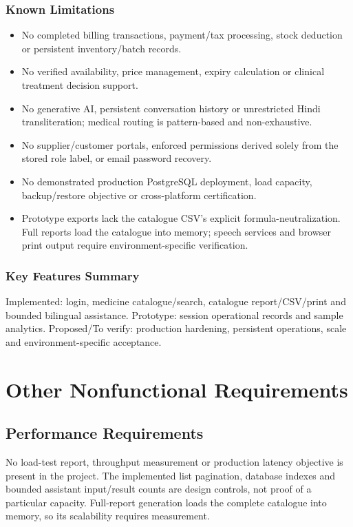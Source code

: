 \documentclass{article}
\newcommand{\SummaryBox}[1]{\par\noindent\colorbox{uiFill}{\parbox{\dimexpr\linewidth-2\fboxsep\relax}{\small\sffamily #1}}\par}
\begin{document}
\subsubsection{Known Limitations}
\begin{itemize}
\item No completed billing transactions, payment/tax processing, stock deduction or persistent inventory/batch records.
\item No verified availability, price management, expiry calculation or clinical treatment decision support.
\item No generative AI, persistent conversation history or unrestricted Hindi transliteration; medical routing is pattern-based and non-exhaustive.
\item No supplier/customer portals, enforced permissions derived solely from the stored role label, or email password recovery.
\item No demonstrated production PostgreSQL deployment, load capacity, backup/restore objective or cross-platform certification.
\item Prototype exports lack the catalogue CSV's explicit formula-neutralization. Full reports load the catalogue into memory; speech services and browser print output require environment-specific verification.
\end{itemize}

\subsubsection{Key Features Summary}
\SummaryBox{Implemented: login, medicine catalogue/search, catalogue report/CSV/print and bounded bilingual assistance. Prototype: session operational records and sample analytics. Proposed/To verify: production hardening, persistent operations, scale and environment-specific acceptance.}

\clearpage
\section{Other Nonfunctional Requirements}
\subsection{Performance Requirements}
No load-test report, throughput measurement or production latency objective is present in the project. The implemented list pagination, database indexes and bounded assistant input/result counts are design controls, not proof of a particular capacity. Full-report generation loads the complete catalogue into memory, so its scalability requires measurement.
\end{document}
